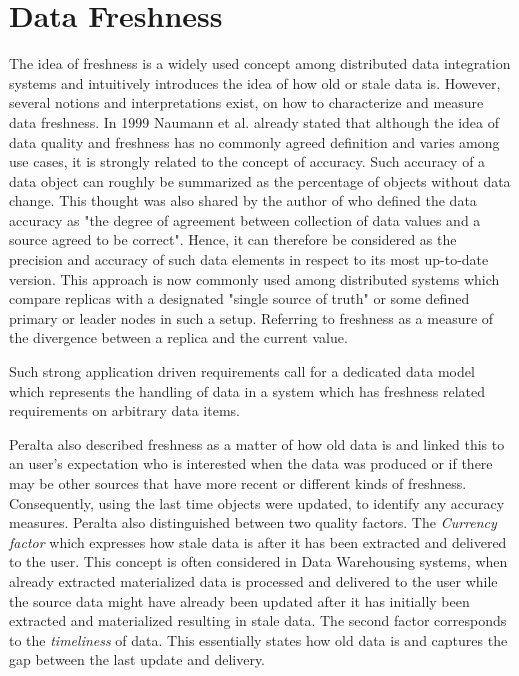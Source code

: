\section{Data Freshness}
\label{sec:definition}
The idea of freshness is a widely used concept among distributed data integration systems and intuitively introduces the idea of how old or stale data is.
However, several notions and interpretations exist, on how to characterize and measure data freshness.
In 1999 Naumann et al. \cite{naumann:1999} already stated that although the idea of data quality and freshness has no commonly agreed definition and varies
among use cases, it is strongly related to the concept of accuracy. Such accuracy of a data object can roughly be summarized as the percentage of 
objects without data change. This thought was also shared by the author of \cite{redman:1996} who defined the data accuracy as "the degree of agreement between 
collection of data values and a source agreed to be correct".
Hence, it can therefore be considered as the precision and accuracy of such data elements in respect to its most up-to-date version.
This approach is now commonly used among distributed systems which compare replicas with a designated "single source of truth" or some defined 
primary or leader nodes in such a setup. Referring to freshness as a measure of the divergence between a replica and the current value.  

Such strong application driven requirements call for a dedicated data model which represents the handling of data in a system which has
freshness related requirements on arbitrary data items.


Peralta \cite{peralta:2006} also described freshness as a matter of how old data is and linked this to an user's expectation who is interested when the data was produced
or if there may be other sources that have more recent or different kinds of freshness. 
Consequently, using the last time objects were updated, to identify any accuracy measures. Peralta also distinguished between two quality factors. 
The \emph{Currency factor} which expresses how stale data is after it has been extracted and
delivered to the user. This concept is often considered in Data Warehousing systems, when already extracted materialized data is processed and delivered to the user 
while the source data might have already been updated after it has initially been extracted and materialized resulting in stale data.
The second factor corresponds to the \emph{timeliness} of data. This essentially states how old data is and captures the gap between the last update and delivery.


